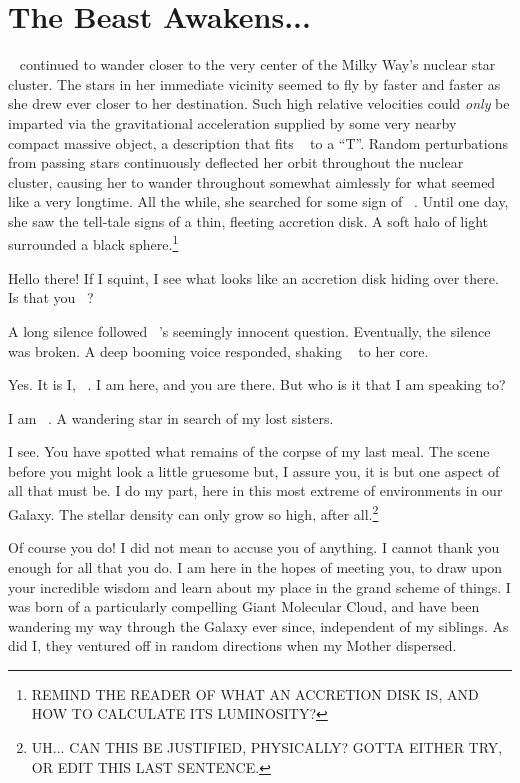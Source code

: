 \documentclass[main.tex]{subfiles}
\begin{document}
\chapter{The Beast Awakens...}

\newpara \nar \rmelectra~ continued to wander closer to the very center of the Milky Way's nuclear star cluster.  The stars in her immediate vicinity seemed to fly by faster and faster as she drew ever closer to her destination.  Such high relative velocities could \textit{only} be imparted via the gravitational acceleration supplied by some very nearby compact massive object, a description that fits \rmchiron~ to a ``T''.  Random perturbations from passing stars continuously deflected her orbit throughout the nuclear cluster, causing her to wander throughout somewhat aimlessly for what seemed like a very longtime.  All the while, she searched for some sign of \rmchiron~.  Until one day, she saw the tell-tale signs of a thin, fleeting accretion disk.  A soft halo of light surrounded a black sphere.\footnote{REMIND THE READER OF WHAT AN ACCRETION DISK IS, AND HOW TO CALCULATE ITS LUMINOSITY?}

\newpara \Electra  Hello there!  If I squint, I see what looks like an accretion disk hiding over there.  Is that you \rmchiron~?

\newpara \nar A long silence followed \rmelectra~'s seemingly innocent question.  Eventually, the silence was broken. A deep booming voice responded, shaking \rmelectra~ to her core.

\newpara \Chiron Yes.  It is I, \rmchiron~.  I am here, and you are there.  But who is it that I am speaking to?

\newpara \Electra I am \rmelectra~.  A wandering star in search of my lost sisters.

\newpara \Chiron I see.  You have spotted what remains of the corpse of my last meal.  The scene before you might look a little gruesome but, I assure you, it is but one aspect of all that must be.  I do my part, here in this most extreme of environments in our Galaxy.  The stellar density can only grow so high, after all.\footnote{UH... CAN THIS BE JUSTIFIED, PHYSICALLY?  GOTTA EITHER TRY, OR EDIT THIS LAST SENTENCE.}

\newpara \Electra Of course you do!  I did not mean to accuse you of anything.  I cannot thank you enough for all that you do.  I am here in the hopes of meeting you, to draw upon your incredible wisdom and learn about my place in the grand scheme of things.  I was born of a particularly compelling Giant Molecular Cloud, and have been wandering my way through the Galaxy ever since, independent of my siblings.  As did I, they ventured off in random directions when my Mother dispersed.
\end{document}

